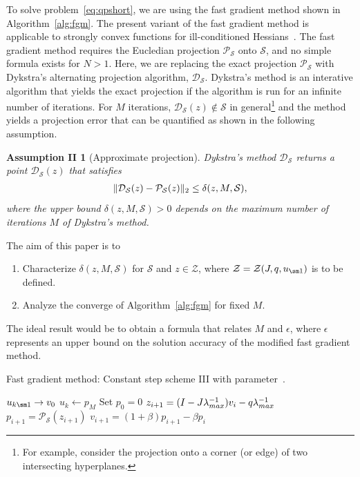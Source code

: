 \documentclass[hidelinks]{article}
\begin{document}
To solve problem~\eqref{eq:qpshort}, we are using the fast gradient method shown in Algorithm~\ref{alg:fgm}. The present variant of the fast gradient method is applicable to strongly convex functions for ill-conditioned Hessians~\cite[Ch. 2.2.4]{OPTIMNESTEROV}. The fast gradient method requires the Eucledian projection $\mathcal{P}_{\mathcal{S}}$ onto $\mathcal{S}$, and no simple formula exists for $N>1$. Here, we are replacing the exact projection $\mathcal{P}_{\mathcal{S}}$ with Dykstra's alternating projection algorithm, $\mathcal{D}_{\mathcal{S}}$. Dykstra's method is an interative algorithm that yields the exact projection if the algorithm is run for an infinite number of iterations. For $M$ iterations, $\mathcal{D}_\mathcal{S}(z)\not\in\mathcal{S}$ in general\footnote{For example, consider the projection onto a corner (or edge) of two intersecting hyperplanes.} and the method yields a projection error that can be quantified as shown in the following assumption.
\newtheorem*{ass3}{Assumption II}
\begin{ass3}[Approximate projection]
Dykstra's method $\mathcal{D}_{\mathcal{S}}$ returns a point $\mathcal{D}_{\mathcal{S}}(z)$ that satisfies
\begin{align}
\Vert \mathcal{D}_{\mathcal{S}}(z) - \mathcal{P}_{\mathcal{S}}(z) \Vert_2 \leq \delta (z,M,\mathcal{S}),
\end{align}
where the upper bound $\delta (z,M,\mathcal{S})>0$ depends on the maximum number of iterations $M$ of Dykstra's method.
\end{ass3}
The aim of this paper is to
\begin{enumerate}
\item Characterize $\delta (z,M,\mathcal{S})$ for $\mathcal{S}$ and $z\in\mathcal{Z}$, where $\mathcal{Z}=\mathcal{Z}(J,q,u_{\sm 1})$ is to be defined.
\item Analyze the converge of Algorithm~\ref{alg:fgm} for fixed $M$.
\end{enumerate}
The ideal result would be to obtain a formula that relates $M$ and $\epsilon$, where $\epsilon$ represents an upper bound on the solution accuracy of the modified fast gradient method. 
%
\begin{algorithm}[H]
 \caption{Fast gradient method: Constant step scheme III with parameter~\cite[Ch. 2.2.4]{OPTIMNESTEROV}.}\label{alg:fgm}
 \begin{algorithmic}[1]
    \REQUIRE ${u}_{k\sm 1}\rightarrow v_0$
    \ENSURE ${u}_k\leftarrow p_M$
    \STATE Set $p_0=0$
  	  \STATE ${z}_{i+1} = (I - {J}\lambda^{-1}_{max}){v}_i - {q} \lambda^{-1}_{max}$
  	  \STATE ${p}_{i+1} = \mathcal{P}_{\mathcal{S}}({z}_{i+1})$
  	  \STATE ${v}_{i+1} = (1+\beta){p}_{i+1} - \beta {p}_i$
	\ENDFOR
 \end{algorithmic}
\end{algorithm}
%
\end{document}
